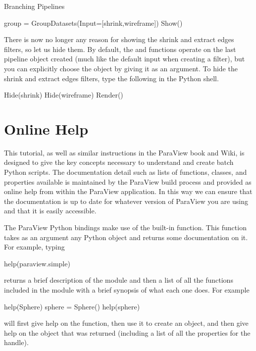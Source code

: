 \begin{exercise}{Branching Pipelines}
  \begin{python}
group = GroupDatasets(Input=[shrink,wireframe])
Show()
  \end{python}

  There is now no longer any reason for showing the shrink and extract
  edges filters, so let us hide them.  By default, the  and
   functions operate on the last pipeline object created (much
  like the default input when creating a filter), but you can explicitly
  choose the object by giving it as an argument.  To hide the shrink and
  extract edges filters, type the following in the Python shell.

  \begin{python}
Hide(shrink)
Hide(wireframe)
Render()
  \end{python}
\end{exercise}


\section{Online Help}
\label{sec:OnlineHelp}

This tutorial, as well as similar instructions in the ParaView book and
Wiki, is designed to give the key concepts necessary to understand and
create batch Python scripts.  The documentation detail such as lists of
functions, classes, and properties available is maintained by the ParaView
build process and provided as online help from within the ParaView
application.  In this way we can ensure that the documentation is up to
date for whatever version of ParaView you are using and that it is easily
accessible.

The ParaView Python bindings make use of the  built-in
function.  This function takes as an argument any Python object and returns
some documentation on it.  For example, typing
\begin{python}
  help(paraview.simple)
\end{python}
returns a brief description of the module and then a list of all the
functions included in the module with a brief synopsis of what each one
does.  For example
\begin{python}
  help(Sphere)
  sphere = Sphere()
  help(sphere)
\end{python}
will first give help on the  function, then use it to create
an object, and then give help on the object that was returned (including a
list of all the properties for the handle).

